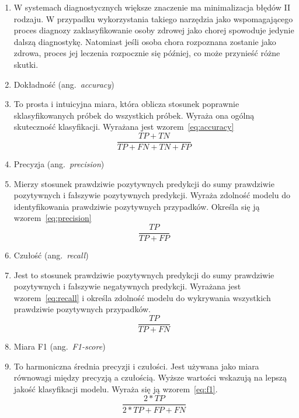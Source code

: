 \begin{enumerate}[label={\alph*)}]
    \item [] W systemach diagnostycznych większe znaczenie ma minimalizacja błędów II rodzaju.
    W przypadku wykorzystania takiego narzędzia jako wspomagającego proces diagnozy zaklasyfikowanie osoby zdrowej jako chorej spowoduje jedynie dalszą diagnostykę.
    Natomiast jeśli osoba chora rozpoznana zostanie jako zdrowa, proces jej leczenia rozpocznie się później, co może przynieść różne skutki.
	\item Dokładność (ang.~\emph{accuracy})
    \item [] To prosta i intuicyjna miara, która oblicza stosunek poprawnie sklasyfikowanych próbek do wszystkich próbek.
    Wyraża ona ogólną skuteczność klasyfikacji.
    Wyrażana jest wzorem~\ref{eq:accuracy}
    \begin{equation}
        \frac{TP + TN}{TP + FN + TN + FP}\label{eq:accuracy}
    \end{equation}
    \item Precyzja (ang.~\emph{precision})
    \item [] Mierzy stosunek prawdziwie pozytywnych predykcji do sumy prawdziwie pozytywnych i  fałszywie pozytywnych predykcji.
Wyraża zdolność modelu do identyfikowania prawdziwie pozytywnych przypadków.
Określa się ją wzorem~\ref{eq:precision}
      \begin{equation}
        \frac{TP}{TP + FP}\label{eq:precision}
    \end{equation}
    \item Czułość (ang.~\emph{recall})
    \item [] Jest to stosunek prawdziwie pozytywnych predykcji do sumy prawdziwie pozytywnych i fałszywie negatywnych predykcji.
Wyrażana jest wzorem~\ref{eq:recall} i określa zdolność modelu do wykrywania wszystkich prawdziwie pozytywnych przypadków.
    \begin{equation}
        \frac{TP}{TP + FN}\label{eq:recall}
    \end{equation}
    \item Miara F1 (ang.~\emph{F1-score})
    \item [] To harmoniczna średnia precyzji i czułości.
Jest używana jako miara równowagi między precyzją a czułością.
Wyższe wartości wskazują na lepszą jakość klasyfikacji modelu.
Wyraża się ją wzorem~\ref{eq:f1}.
  \begin{equation}
        \frac{2 * TP}{2 * TP + FP + FN}\label{eq:f1}
    \end{equation}
\end{enumerate}